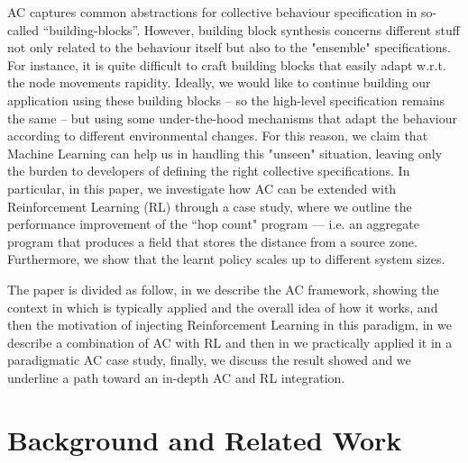 \documentclass[conference]{IEEEtran}
\begin{document}
AC captures common abstractions for collective behaviour specification in so-called ``building-blocks''. 
However, building block synthesis concerns different stuff not only related to the behaviour itself
 but also to the "ensemble" specifications. 
 For instance, it is quite difficult to craft building blocks
 that easily adapt w.r.t. the node movements rapidity.
%
Ideally, we would like to continue building our application using these building blocks -- so the high-level specification remains the same -- but using some
 under-the-hood mechanisms that adapt the behaviour according to different environmental changes. For this reason, we claim that Machine Learning can help us in handling this "unseen" situation, leaving only the burden
 to developers of defining the right collective specifications.
In particular, in this paper,
 we investigate how AC can be extended with Reinforcement Learning (RL) through a case study,
 where we outline the performance improvement of the ``hop count" program ---
 i.e. an aggregate program that produces a field that stores the distance from a source zone. 
 Furthermore, we show that the learnt policy scales up to different system sizes.

The paper is divided as follow, in  we describe
 the AC framework, showing the context in which
 is typically applied and the overall idea of how it works, and then the motivation of injecting Reinforcement Learning in this paradigm,
 in  we describe a combination of AC with RL and then in
  we practically applied it in a paradigmatic AC case study,
 finally,  we discuss the result showed and we underline a path toward an in-depth AC and RL integration.

 \section{Background and Related Work}\label{background}

\end{document}
